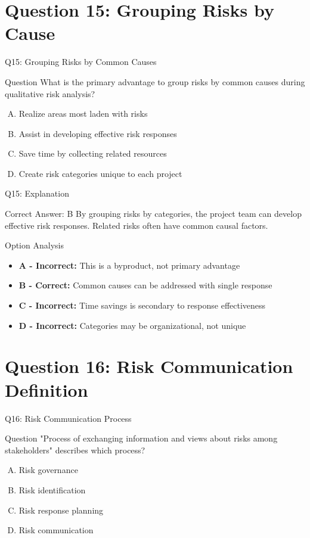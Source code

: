 \documentclass{beamer}
\begin{document}
	\section{Question 15: Grouping Risks by Cause}
	
	\begin{frame}{Q15: Grouping Risks by Common Causes}
		\begin{block}{Question}
			What is the primary advantage to group risks by common causes during qualitative risk analysis?
		\end{block}
		\begin{enumerate}[(A)]
			\item Realize areas most laden with risks
			\item Assist in developing effective risk responses
			\item Save time by collecting related resources
			\item Create risk categories unique to each project
		\end{enumerate}
	\end{frame}
	
	\begin{frame}{Q15: Explanation}
		\begin{block}{Correct Answer: B}
			By grouping risks by categories, the project team can develop effective risk responses. Related risks often have common causal factors.
		\end{block}
		\begin{block}{Option Analysis}
			\begin{itemize}
				\item \textbf{A - Incorrect:} This is a byproduct, not primary advantage
				\item \textbf{B - Correct:} Common causes can be addressed with single response
				\item \textbf{C - Incorrect:} Time savings is secondary to response effectiveness
				\item \textbf{D - Incorrect:} Categories may be organizational, not unique
			\end{itemize}
		\end{block}
	\end{frame}
	
	\section{Question 16: Risk Communication Definition}
	
	\begin{frame}{Q16: Risk Communication Process}
		\begin{block}{Question}
			"Process of exchanging information and views about risks among stakeholders" describes which process?
		\end{block}
		\begin{enumerate}[(A)]
			\item Risk governance
			\item Risk identification
			\item Risk response planning
			\item Risk communication
		\end{enumerate}
	\end{frame}
	
\end{document}
